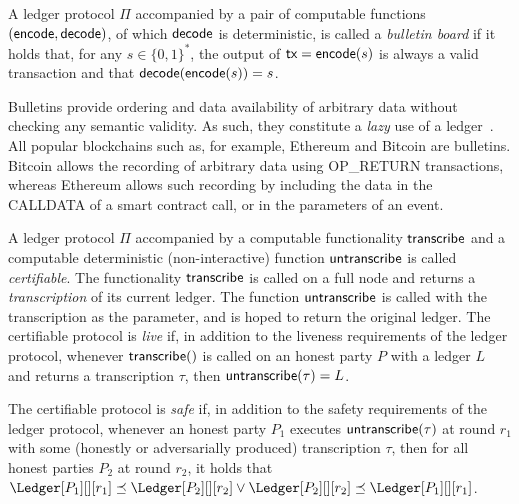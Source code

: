 \begin{definition}
  A ledger protocol $\Pi$ accompanied by a pair of computable
  functions $(\textsf{encode}, \textsf{decode})$, of which $\textsf{decode}$ is deterministic,
  is called a \emph{bulletin board} if it holds that, for any $s \in \{0, 1\}^*$,
  the output of $\textsf{tx} = \textsf{encode}(s)$ is always a valid
  transaction and that $\textsf{decode}(\textsf{encode}(s)) = s$.
\end{definition}

Bulletins provide ordering and data availability of arbitrary data without checking
any semantic validity. As such, they constitute a \emph{lazy} use of a ledger~\cite{lazyledger,lazylight}.
All popular blockchains such as, for example, Ethereum and Bitcoin are bulletins.
Bitcoin allows the recording of arbitrary data using \textsf{OP\_RETURN}
transactions, whereas Ethereum allows such recording by including the
data in the \textsf{CALLDATA} of a smart contract call, or in the parameters
of an event.

\begin{definition}[Certifiability]
  A ledger protocol $\Pi$ accompanied by a computable functionality $\textsf{transcribe}$
  and a computable deterministic (non-interactive) function $\textsf{untranscribe}$ is called
  \emph{certifiable}. The functionality $\textsf{transcribe}$ is called on a full node
  and returns a \emph{transcription} of its current ledger. The function
  $\textsf{untranscribe}$ is called with the transcription as the parameter,
  and is hoped to return the original ledger.
  The certifiable protocol is \emph{live}
  if, in addition to the liveness requirements of the ledger protocol,
  whenever $\textsf{transcribe}()$ is called on an honest
  party $P$ with a ledger $L$ and returns a transcription $\tau$,
  then $\textsf{untranscribe}(\tau) = L$.

  The certifiable protocol is \emph{safe}
  if,
  in addition to the safety requirements of the ledger protocol,
  whenever an honest party $P_1$ executes $\textsf{untranscribe}(\tau)$ at round $r_1$
  with some (honestly or adversarially produced) transcription $\tau$,
  then for all honest parties $P_2$ at round $r_2$, it holds that
  $\Ledger[P_1][][r_1] \preceq \Ledger[P_2][][r_2] \lor \Ledger[P_2][][r_2] \preceq \Ledger[P_1][][r_1]$.
\end{definition}

